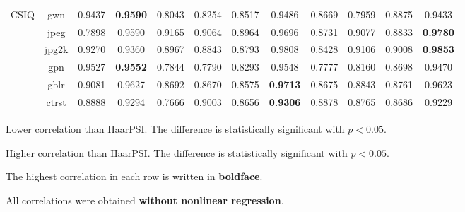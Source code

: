 \documentclass[11pt,a4paper]{article}
\begin{document}
\begin{table}[!htb]
\begin{scriptsize}
{\begin{threeparttable}
\begin{tabular}{*{12}{c}}
\\
\multirow{6}{*}{CSIQ} & gwn & 0.9437 & \textbf{0.9590} & \cellcolor{green!25}0.8043 & \cellcolor{green!25}0.8254 & \cellcolor{green!25}0.8517 & 0.9486 & \cellcolor{green!25}0.8669 & \cellcolor{green!25}0.7959 & \cellcolor{green!25}0.8875 & 0.9433\\
& jpeg & \cellcolor{green!25}0.7898 & \cellcolor{green!25}0.9590 & \cellcolor{green!25}0.9165 & \cellcolor{green!25}0.9064 & \cellcolor{green!25}0.8964 & 0.9696 & \cellcolor{green!25}0.8731 & \cellcolor{green!25}0.9077 & \cellcolor{green!25}0.8833 & \textbf{0.9780}\\
& jpg2k & \cellcolor{green!25}0.9270 & \cellcolor{green!25}0.9360 & \cellcolor{green!25}0.8967 & \cellcolor{green!25}0.8843 & \cellcolor{green!25}0.8793 & 0.9808 & \cellcolor{green!25}0.8428 & \cellcolor{green!25}0.9106 & \cellcolor{green!25}0.9008 & \textbf{0.9853}\\
& gpn & 0.9527 & \textbf{0.9552} & \cellcolor{green!25}0.7844 & \cellcolor{green!25}0.7790 & \cellcolor{green!25}0.8293 & 0.9548 & \cellcolor{green!25}0.7777 & \cellcolor{green!25}0.8160 & \cellcolor{green!25}0.8698 & 0.9470\\
& gblr & \cellcolor{green!25}0.9081 & 0.9627 & \cellcolor{green!25}0.8692 & \cellcolor{green!25}0.8670 & \cellcolor{green!25}0.8575 & \textbf{0.9713} & \cellcolor{green!25}0.8675 & \cellcolor{green!25}0.8843 & \cellcolor{green!25}0.8761 & 0.9623\\
& ctrst & 0.8888 & 0.9294 & \cellcolor{green!25}0.7666 & 0.9003 & \cellcolor{green!25}0.8656 & \textbf{0.9306} & 0.8878 & 0.8765 & \cellcolor{green!25}0.8686 & 0.9229\\\midrule[0.5mm]
\end{tabular}
\begin{tablenotes}
\item \colorbox{green!25}{Lower correlation than HaarPSI. The difference is statistically significant with $p < 0.05$.}
\item \colorbox{red!25}{Higher correlation than HaarPSI. The difference is statistically significant with $p < 0.05$.}
\item The highest correlation in each row is written in \textbf{boldface}.
\item All correlations were obtained \textbf{without nonlinear regression}.
\end{tablenotes}
\end{threeparttable}}
\end{scriptsize}
\end{table}
\end{document}
